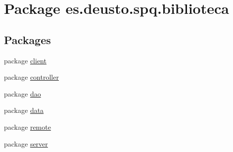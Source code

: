 \hypertarget{namespacees_1_1deusto_1_1spq_1_1biblioteca}{}\section{Package es.\+deusto.\+spq.\+biblioteca}
\label{namespacees_1_1deusto_1_1spq_1_1biblioteca}
\subsection*{Packages}
\begin{DoxyCompactItemize}
\item 
package \mbox{\hyperlink{namespacees_1_1deusto_1_1spq_1_1biblioteca_1_1client}{client}}
\item 
package \mbox{\hyperlink{namespacees_1_1deusto_1_1spq_1_1biblioteca_1_1controller}{controller}}
\item 
package \mbox{\hyperlink{namespacees_1_1deusto_1_1spq_1_1biblioteca_1_1dao}{dao}}
\item 
package \mbox{\hyperlink{namespacees_1_1deusto_1_1spq_1_1biblioteca_1_1data}{data}}
\item 
package \mbox{\hyperlink{namespacees_1_1deusto_1_1spq_1_1biblioteca_1_1remote}{remote}}
\item 
package \mbox{\hyperlink{namespacees_1_1deusto_1_1spq_1_1biblioteca_1_1server}{server}}
\end{DoxyCompactItemize}
